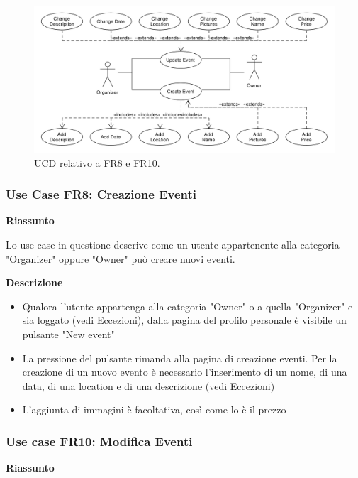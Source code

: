 \documentclass[9pt]{extarticle}
\begin{document}
\begin{figure}[!htb]
	\centering
	\includegraphics[width=\linewidth]{./images/FR8-10.pdf}
	\caption{UCD relativo a FR8 e FR10.}
	\label{fig:UCD_FR8-10}
\end{figure}

\subsubsection*{Use Case FR8: Creazione Eventi}

\textbf{Riassunto}

Lo use case in questione descrive come un utente appartenente alla categoria "Organizer" oppure "Owner" può creare nuovi eventi.

\newpage

\textbf{Descrizione}

\begin{itemize}
	\item Qualora l'utente appartenga alla categoria "Owner" o a quella "Organizer" e sia loggato (vedi \hyperref[Eccezioni-FR8-10]{Eccezioni}), dalla pagina del profilo personale è visibile un pulsante "New event"
	\item La pressione del pulsante rimanda alla pagina di creazione eventi. Per la creazione di un nuovo evento è necessario l'inserimento di un nome, di una data, di una location e di una descrizione (vedi \hyperref[Eccezioni-FR8-10]{Eccezioni})
	\item L'aggiunta di immagini è facoltativa, così come lo è il prezzo 
\end{itemize}

\subsubsection*{Use case FR10: Modifica Eventi}

\textbf{Riassunto}
\end{document}
